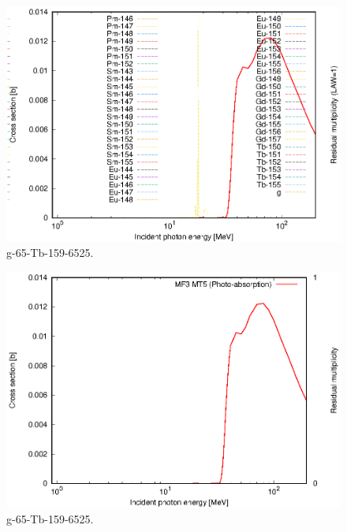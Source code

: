 \begin{figure}
 \includegraphics[width=\linewidth]{eps/g_65-Tb-159_6525.eps}
  \caption{g-65-Tb-159-6525.}
\end{figure}
\begin{figure}
 \includegraphics[width=\linewidth]{eps-law0/g_65-Tb-159_6525.eps}
 \caption{g-65-Tb-159-6525.}
\end{figure}
\newpage \clearpage

